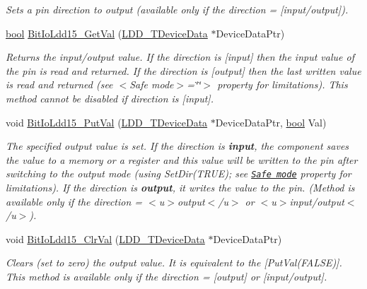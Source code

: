 \begin{DoxyCompactItemize}
\begin{DoxyCompactList}\small\item\em Sets a pin direction to output (available only if the direction = {\itshape \mbox{[}input/output\mbox{]}}). \end{DoxyCompactList}\item 
\hyperlink{group___p_e___types__module_ga97a80ca1602ebf2303258971a2c938e2}{bool} \hyperlink{group___bit_io_ldd15__module_ga6b6e379b6e145395c401f29e07e51e6f}{Bit\+Io\+Ldd15\+\_\+\+Get\+Val} (\hyperlink{group___p_e___types__module_gac5cf1362f1f0e3a2ce71b1bf2276d091}{L\+D\+D\+\_\+\+T\+Device\+Data} $\ast$Device\+Data\+Ptr)
\begin{DoxyCompactList}\small\item\em Returns the input/output value. If the direction is \mbox{[}input\mbox{]} then the input value of the pin is read and returned. If the direction is \mbox{[}output\mbox{]} then the last written value is read and returned (see $<$\+Safe mode$>$=\char`\"{}\char`\"{}$>$ property for limitations). This method cannot be disabled if direction is \mbox{[}input\mbox{]}. \end{DoxyCompactList}\item 
void \hyperlink{group___bit_io_ldd15__module_ga875a36906d376856264c546b784ae909}{Bit\+Io\+Ldd15\+\_\+\+Put\+Val} (\hyperlink{group___p_e___types__module_gac5cf1362f1f0e3a2ce71b1bf2276d091}{L\+D\+D\+\_\+\+T\+Device\+Data} $\ast$Device\+Data\+Ptr, \hyperlink{group___p_e___types__module_ga97a80ca1602ebf2303258971a2c938e2}{bool} Val)
\begin{DoxyCompactList}\small\item\em The specified output value is set. If the direction is {\bfseries  input}, the component saves the value to a memory or a register and this value will be written to the pin after switching to the output mode (using {\ttfamily Set\+Dir(\+T\+R\+U\+E)}; see \href{BitIOProperties.html#SafeMode}{\tt Safe mode} property for limitations). If the direction is {\bfseries output}, it writes the value to the pin. (Method is available only if the direction = $<$u$>${\ttfamily output}$<$/u$>$ or $<$u$>${\ttfamily  input/output}$<$/u$>$). \end{DoxyCompactList}\item 
void \hyperlink{group___bit_io_ldd15__module_ga4d39e4bded6e2f7edd0f350a6d72d2f6}{Bit\+Io\+Ldd15\+\_\+\+Clr\+Val} (\hyperlink{group___p_e___types__module_gac5cf1362f1f0e3a2ce71b1bf2276d091}{L\+D\+D\+\_\+\+T\+Device\+Data} $\ast$Device\+Data\+Ptr)
\begin{DoxyCompactList}\small\item\em Clears (set to zero) the output value. It is equivalent to the \mbox{[}Put\+Val(\+F\+A\+L\+S\+E)\mbox{]}. This method is available only if the direction = {\itshape \mbox{[}output\mbox{]}} or {\itshape \mbox{[}input/output\mbox{]}}. \end{DoxyCompactList}\item 

\end{DoxyCompactItemize}
